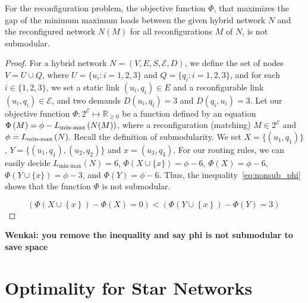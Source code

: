 \documentclass[sigconf]{acmart}
\newcommand{\E}{\mathcal{E}}  %
\newcommand\wenkai[1]{\color{green}\textbf{Wenkai: #1}\color{black}}
\begin{document}
\begin{theorem}
For the reconfiguration problem, the objective function $\Phi$, that maximizes the gap of the minimum maximum loads between the given hybrid network $N$ and the reconfigured network $N(M)$ for all reconfigurations $M$ of $N$, is not submodular. 
\end{theorem}
\begin{proof}
	For a hybrid network $N=(V,E,S,\E,D)$, we define the set of nodes $V=U\cup Q$, where $U=\{u_i:i=1,2,3\}$ and $Q=\{q_i:i=1,2,3\}$, and for each $i\in \{1,2,3\}$, we set a static link $(u_i,q_i)\in E$ and a reconfigurable link $(u_i,q_i)\in \E$, and two demands $D(u_i,q_i)=3$ and $D(q_i,u_i)=3$. Let our objective function $\Phi: 2^\E\mapsto \mathbb{R}_{\ge0}$ be a function defined by an equation $\Phi\left(M\right)=\phi-L_{\textnormal{min-max}}\left(N(M)\right)$, where  a reconfiguration (matching) $M\in 2^\E$ and   $\phi=L_{\textnormal{min-max}}\left(N\right)$. Recall the definition of submodularity. We set $X=\{(u_1,q_1)\}$, $Y=\{(u_1,q_1),(u_2,q_2)\}$ and $x=(u_3,q_3)$. For our routing rules,  we can easily decide $L_{\text{min-max}}\left(N \right)=6$, $\Phi\left(X \cup\{x\}\right)=\phi-6$, $\Phi\left(X\right)=\phi-6$, $\Phi\left(Y\cup\{x\}\right)=\phi-3$, and $\Phi\left(Y\right)=\phi-6$. Thus, the inequality~\eqref{eq:nonsub_phi} shows that the function $\Phi$ is not submodular. 
	
	\begin{equation}
\left(\Phi\left(X\cup\left\{x\right\}\right)-\Phi\left(X \right)=0\right)  < \left(\Phi\left(Y\cup\left\{x\right\}\right)-\Phi\left(Y\right)=3\right)\, \label{eq:nonsub_phi} 
	\end{equation}
\end{proof}
\wenkai{you remove the inequality and say phi is not submodular to save space}
\section{Optimality for Star Networks}\label{sec:star}
\end{document}
